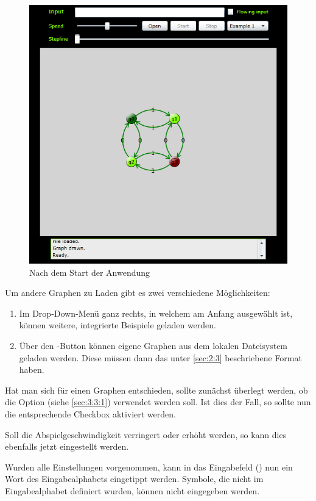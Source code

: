 \begin{figure}[h]
	\centering
	\includegraphics[scale=0.65]{gui.png}
	\caption{\label{fig:gui} Nach dem Start der Anwendung}
\end{figure}

Um andere Graphen zu Laden gibt es zwei verschiedene Möglichkeiten:
\begin{enumerate}
	\item Im Drop-Down-Menü ganz rechts, in welchem am Anfang 
		ausgewählt ist, können weitere, integrierte Beispiele geladen werden.

	\item Über den -Button können eigene Graphen aus dem lokalen Dateisystem
		geladen werden. Diese müssen dann das unter \ref{sec:2:3} beschriebene Format haben.
\end{enumerate}

Hat man sich für einen Graphen entschieden, sollte zunächst überlegt werden, ob
die Option  (siehe \ref{sec:3:3:1}) verwendet werden soll. Ist dies der
Fall, so sollte nun die entsprechende Checkbox aktiviert werden.

Soll die Abspielgeschwindigkeit verringert oder erhöht werden, so kann dies
ebenfalls jetzt eingestellt werden.

Wurden alle Einstellungen vorgenommen, kann in das Eingabefeld () nun
ein Wort des Eingabealphabets eingetippt werden. Symbole, die nicht im
Eingabealphabet definiert wurden, können nicht eingegeben werden.

